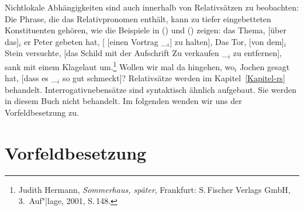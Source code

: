 Nichtlokale Abhängigkeiten sind auch innerhalb von Relativsätzen zu beobachten: Die Phrase, die
das Relativpronomen enthält, kann zu tiefer eingebetteten Konstituenten gehören, wie die
Beispiele in () und () zeigen:
\eal
\label{bsp-nla-rs}
\ex{}
das Thema, [über das]$_i$ er Peter gebeten hat, [ [einen Vortrag \_$_i$] zu halten],
\ex{} 
Das Tor, [von dem]$_i$ Stein versuchte, [das Schild mit der Aufschrift \frqq Zu verkaufen\flqq{} \_$_i$ zu entfernen], sank mit einem
Klagelaut um.\footnote{
  Judith Hermann, \emph{Sommerhaus, später}, Frankfurt: S.\,Fischer Verlags GmbH, 3.\, Auf"|lage, 2001, S.\,148.%
}
\zl
\ea
Wollen wir mal da hingehen, wo$_i$ Jochen gesagt hat, [dass es \_$_i$ so gut schmeckt]?
\z{}
Relativsätze werden im Kapitel~\ref{Kapitel-rs} behandelt. Interrogativnebensätze sind syntaktisch ähnlich aufgebaut.
Sie werden in diesem Buch nicht behandelt. Im folgenden wenden wir uns der Vorfeldbesetzung zu.


\section{Vorfeldbesetzung}


